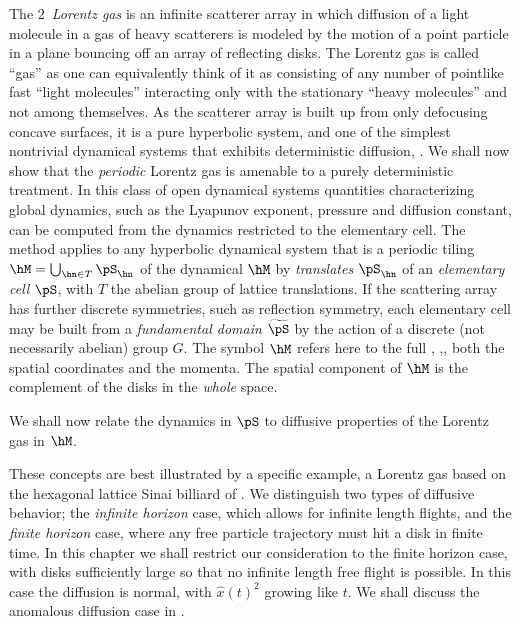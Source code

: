 The $2$\dmn\ {\em Lorentz gas} is an infinite scatterer array in which
diffusion of a light molecule in a gas of heavy scatterers is modeled
by the motion of a point particle in a plane bouncing off an array of
reflecting disks.  The Lorentz gas is called ``gas'' as one can
equivalently think of it as consisting of any number of pointlike fast
``light molecules'' interacting only with the stationary ``heavy
molecules'' and not among themselves.  As the scatterer array is built
up from only defocusing concave surfaces, it is a pure hyperbolic
system, and one of the simplest nontrivial dynamical systems that
exhibits deterministic diffusion, .
We shall now show that the {\em periodic} Lorentz gas is amenable to a
purely deterministic treatment.  In this class of open dynamical
systems quantities characterizing global dynamics, such as the
Lyapunov exponent, pressure and diffusion constant, can be computed
from the dynamics restricted to the elementary cell.  The method
applies to any hyperbolic dynamical system that is a periodic tiling
$\hM=\bigcup_{ \hn \in T} \pS_{\hn}$ of the dynamical {\statesp} $\hM$
by {\em translates} $\pS_{\hn}$ of an {\em elementary cell} $\pS$,
with $T$ the abelian group of lattice translations.  If the scattering
array has further discrete symmetries, such as reflection symmetry,
each elementary cell may be built from a {\em fundamental domain}
${\widetilde \pS}$ by the action of a discrete (not necessarily
abelian) group $G$.  The symbol $\hM$ refers here to the full
{\statesp}, \ie,, both the spatial coordinates and the momenta.  The
spatial component of $\hM$ is the complement of the disks in the {\em
whole} space.

We shall now relate the dynamics in $\pS$ to diffusive properties of
the Lorentz gas in $\hM$.

These concepts are best illustrated by a specific example, a Lorentz
gas based on the hexagonal lattice Sinai billiard of
.
%
%
We distinguish two types of diffusive behavior; the {\em infinite
horizon} case, which allows for infinite length flights, and the {\em
finite horizon} case, where any free particle trajectory must hit a
disk in finite time.  In this chapter we shall restrict our
consideration to the finite horizon case, with disks sufficiently
large so that no infinite length free flight is possible.  In this
case the diffusion is normal, with $\hat{x}(t)^2$ growing like $t$.
We shall discuss the anomalous diffusion case in
.

